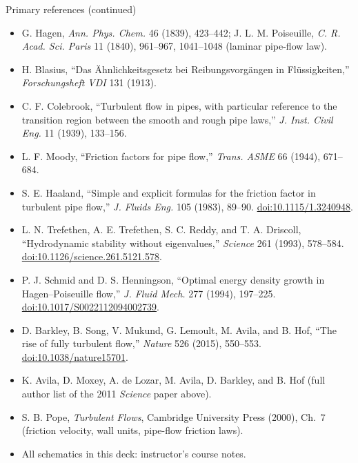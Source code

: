 \documentclass[aspectratio=169,11pt]{beamer}
\begin{document}
\begin{frame}{Primary references (continued)}
\scriptsize
\begin{itemize}\itemsep3pt
  \item G. Hagen, \emph{Ann. Phys. Chem.} 46 (1839), 423--442; J. L. M. Poiseuille, \emph{C. R. Acad. Sci. Paris} 11 (1840), 961--967, 1041--1048 (laminar pipe-flow law).
  \item H. Blasius, ``Das \"Ahnlichkeitsgesetz bei Reibungsvorg\"angen in Fl\"ussigkeiten,'' \emph{Forschungsheft VDI} 131 (1913).
  \item C. F. Colebrook, ``Turbulent flow in pipes, with particular reference to the transition region between the smooth and rough pipe laws,'' \emph{J. Inst. Civil Eng.} 11 (1939), 133--156.
  \item L. F. Moody, ``Friction factors for pipe flow,'' \emph{Trans. ASME} 66 (1944), 671--684.
  \item S. E. Haaland, ``Simple and explicit formulas for the friction factor in turbulent pipe flow,'' \emph{J. Fluids Eng.} 105 (1983), 89--90. \href{https://doi.org/10.1115/1.3240948}{doi:10.1115/1.3240948}.
  \item L. N. Trefethen, A. E. Trefethen, S. C. Reddy, and T. A. Driscoll, ``Hydrodynamic stability without eigenvalues,'' \emph{Science} 261 (1993), 578--584. \href{https://doi.org/10.1126/science.261.5121.578}{doi:10.1126/science.261.5121.578}.
  \item P. J. Schmid and D. S. Henningson, ``Optimal energy density growth in Hagen--Poiseuille flow,'' \emph{J. Fluid Mech.} 277 (1994), 197--225. \href{https://doi.org/10.1017/S0022112094002739}{doi:10.1017/S0022112094002739}.
  \item D. Barkley, B. Song, V. Mukund, G. Lemoult, M. Avila, and B. Hof, ``The rise of fully turbulent flow,'' \emph{Nature} 526 (2015), 550--553. \href{https://doi.org/10.1038/nature15701}{doi:10.1038/nature15701}.
  \item K. Avila, D. Moxey, A. de Lozar, M. Avila, D. Barkley, and B. Hof (full author list of the 2011 \emph{Science} paper above).
  \item S. B. Pope, \emph{Turbulent Flows}, Cambridge University Press (2000), Ch.~7 (friction velocity, wall units, pipe-flow friction laws).
  \item All schematics in this deck: instructor's course notes.
\end{itemize}
\end{frame}
\end{document}
